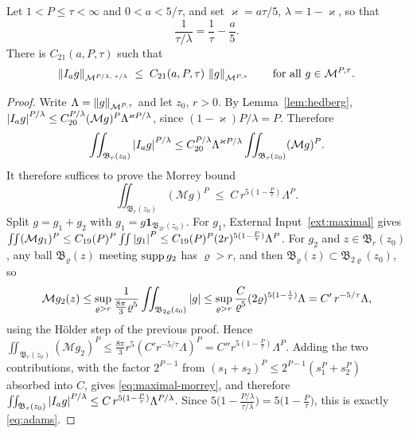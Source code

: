 \documentclass[11pt,reqno]{amsart}
\begin{document}
\begin{corollary}\label{cor:adams}
Let $1<P\le\tau<\infty$ and $0<a<5/\tau$, and set $\varkappa=a\tau/5$,
$\lambda=1-\varkappa$, so that
\begin{equation}\label{eq:adams-exponents}
  \frac{1}{\tau/\lambda}=\frac1\tau-\frac a5 .
\end{equation}
There is $C_{21}(a,P,\tau)$ such that
\begin{equation}\label{eq:adams}
  \left\lVert I_{a}g \right\rVert_{\mathcal{M}^{P/\lambda,\;\tau/\lambda}}
  \;\le\;C_{21}(a,P,\tau)\,\left\lVert g \right\rVert_{\mathcal{M}^{P,\tau}}
  \qquad\text{for all }g\in\mathcal{M}^{P,\tau}.
\end{equation}
\end{corollary}

\begin{proof}
Write $\Lambda=\left\lVert g \right\rVert_{\mathcal{M}^{P,\tau}}$ and let $z_{0}$, $r>0$. By
Lemma~\ref{lem:hedberg},
$\left\lvert I_{a}g \right\rvert^{P/\lambda}\le C_{20}^{P/\lambda}
  (\mathcal{M}g)^{P}\Lambda^{\varkappa P/\lambda}$, since
$(1-\varkappa)P/\lambda=P$. Therefore
\[
  \iint_{\mathfrak{B}_{r}(z_{0})}\left\lvert I_{a}g \right\rvert^{P/\lambda}
  \le C_{20}^{P/\lambda}\Lambda^{\varkappa P/\lambda}
     \iint_{\mathfrak{B}_{r}(z_{0})}(\mathcal{M}g)^{P} .
\]
It therefore suffices to prove the Morrey bound
\begin{equation}\label{eq:maximal-morrey}
  \iint_{\mathfrak{B}_{r}(z_{0})}(\mathcal{M}g)^{P}
  \;\le\;C\,r^{5(1-\frac P\tau)}\Lambda^{P}.
\end{equation}
Split $g=g_{1}+g_{2}$ with $g_{1}=g\mathbf{1}_{\mathfrak{B}_{2r}(z_{0})}$. For
$g_{1}$, External Input~\ref{ext:maximal} gives
$\iint(\mathcal{M}g_{1})^{P}\le C_{19}(P)^{P}\iint\left\lvert g_{1} \right\rvert^{P}
 \le C_{19}(P)^{P}(2r)^{5(1-\frac P\tau)}\Lambda^{P}$.
For $g_{2}$ and $z\in\mathfrak{B}_{r}(z_{0})$, any ball
$\mathfrak{B}_{\varrho}(z)$ meeting $\operatorname{supp} g_{2}$ has $\varrho>r$, and then
$\mathfrak{B}_{\varrho}(z)\subset\mathfrak{B}_{2\varrho}(z_{0})$, so
\[
  \mathcal{M}g_{2}(z)\le\sup_{\varrho>r}
    \frac{1}{\tfrac{8\pi}{3}\varrho^{5}}\iint_{\mathfrak{B}_{2\varrho}(z_{0})}\left\lvert g \right\rvert
  \le\sup_{\varrho>r}\frac{C}{\varrho^{5}}(2\varrho)^{5(1-\frac1\tau)}\Lambda
  = C'\,r^{-5/\tau}\Lambda ,
\]
using the H\"older step of the previous proof. Hence
$\iint_{\mathfrak{B}_{r}(z_{0})}(\mathcal{M}g_{2})^{P}
 \le\tfrac{8\pi}{3}r^{5}(C'r^{-5/\tau}\Lambda)^{P}
 =C''r^{5(1-\frac P\tau)}\Lambda^{P}$. Adding the two contributions, with the factor $2^{P-1}$ from
$(s_{1}+s_{2})^{P}\le2^{P-1}(s_{1}^{P}+s_{2}^{P})$ absorbed into $C$, gives
\eqref{eq:maximal-morrey}, and therefore
$\iint_{\mathfrak{B}_{r}(z_{0})}\left\lvert I_{a}g \right\rvert^{P/\lambda}
 \le C\,r^{5(1-\frac P\tau)}\Lambda^{P/\lambda}$. Since
$5\bigl(1-\frac{P/\lambda}{\tau/\lambda}\bigr)=5\bigl(1-\frac P\tau\bigr)$, this
is exactly \eqref{eq:adams}.
\end{proof}
\end{document}

